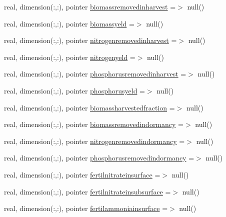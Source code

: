 \begin{DoxyCompactItemize}
\item 
real, dimension(\+:,\+:), pointer \mbox{\hyperlink{structmodulevegetation_1_1t__fluxes_a32d6ccede430d318ab8a3750f704b99b}{biomassremovedinharvest}} =$>$ null()
\item 
real, dimension(\+:,\+:), pointer \mbox{\hyperlink{structmodulevegetation_1_1t__fluxes_aecb9e2b88117717a66620a93329dab78}{biomassyeld}} =$>$ null()
\item 
real, dimension(\+:,\+:), pointer \mbox{\hyperlink{structmodulevegetation_1_1t__fluxes_a7885553c375c493dfd8dcc6d646d3831}{nitrogenremovedinharvest}} =$>$ null()
\item 
real, dimension(\+:,\+:), pointer \mbox{\hyperlink{structmodulevegetation_1_1t__fluxes_a1fd3d4c02e24a849d2476a4426439d47}{nitrogenyeld}} =$>$ null()
\item 
real, dimension(\+:,\+:), pointer \mbox{\hyperlink{structmodulevegetation_1_1t__fluxes_a68145baac067e3bdf3d8ec4bc56ab2b9}{phosphorusremovedinharvest}} =$>$ null()
\item 
real, dimension(\+:,\+:), pointer \mbox{\hyperlink{structmodulevegetation_1_1t__fluxes_a396f66b12f960ce16826967222fcc595}{phosphorusyeld}} =$>$ null()
\item 
real, dimension(\+:,\+:), pointer \mbox{\hyperlink{structmodulevegetation_1_1t__fluxes_af76a99b2717b0b4a344ffbda9262794d}{biomassharvestedfraction}} =$>$ null()
\item 
real, dimension(\+:,\+:), pointer \mbox{\hyperlink{structmodulevegetation_1_1t__fluxes_add0c7719e7ea444c50ef4aa468d49dbc}{biomassremovedindormancy}} =$>$ null()
\item 
real, dimension(\+:,\+:), pointer \mbox{\hyperlink{structmodulevegetation_1_1t__fluxes_a1019800ed56b85f1b883c76be6d41702}{nitrogenremovedindormancy}} =$>$ null()
\item 
real, dimension(\+:,\+:), pointer \mbox{\hyperlink{structmodulevegetation_1_1t__fluxes_ac778590c02c671a8db631ba780e516d6}{phosphorusremovedindormancy}} =$>$ null()
\item 
real, dimension(\+:,\+:), pointer \mbox{\hyperlink{structmodulevegetation_1_1t__fluxes_a54d6cec90c91220e790396efd7a6ba10}{fertilnitrateinsurface}} =$>$ null()
\item 
real, dimension(\+:,\+:), pointer \mbox{\hyperlink{structmodulevegetation_1_1t__fluxes_a116eff7c0a58562c37a2e649f4213eae}{fertilnitrateinsubsurface}} =$>$ null()
\item 
real, dimension(\+:,\+:), pointer \mbox{\hyperlink{structmodulevegetation_1_1t__fluxes_a7d434242dd2764789fc5daafae5563db}{fertilammoniainsurface}} =$>$ null()

\end{DoxyCompactItemize}
